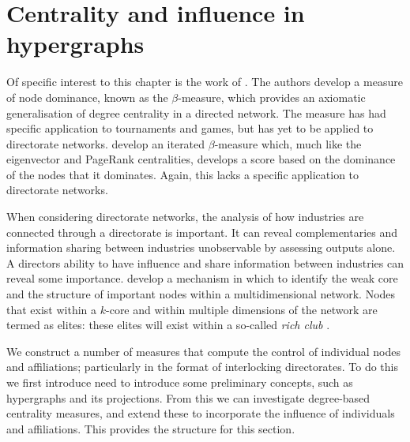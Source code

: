 
\section{Centrality and influence in hypergraphs} 
\label{Theory:Influence}

Of specific interest to this chapter is the work of \citet{BrinkGilles1996, BrinkGilles2000}. The authors develop a measure of node dominance, known as the $\beta$-measure, which provides an axiomatic generalisation of degree centrality in a directed network. The measure has had specific application to tournaments and games, but has yet to be applied to directorate networks. \citet{BormBrink2002} develop an iterated $\beta$-measure which, much like the eigenvector and PageRank centralities, develops a score based on the dominance of the nodes that it dominates. Again, this lacks a specific application to directorate networks.

When considering directorate networks, the analysis of how industries are connected through a directorate is important. It can reveal complementaries and information sharing between industries unobservable by assessing outputs alone. A directors ability to have influence and share information between industries can reveal some importance. \citet{Corominas-MurtraThurner2014} develop a mechanism in which to identify the weak core and the structure of important nodes within a multidimensional network. Nodes that exist within a $k$-core and within multiple dimensions of the network are termed as elites: these elites will exist within a so-called \emph{rich club} \citep{Colizza2006}.

We construct a number of measures that compute the control of individual nodes and affiliations; particularly in the format of interlocking directorates. To do this we first introduce need to introduce some preliminary concepts, such as hypergraphs and its projections. From this we can investigate degree-based centrality measures, and extend these to incorporate the influence of individuals and affiliations. This provides the structure for this section.

